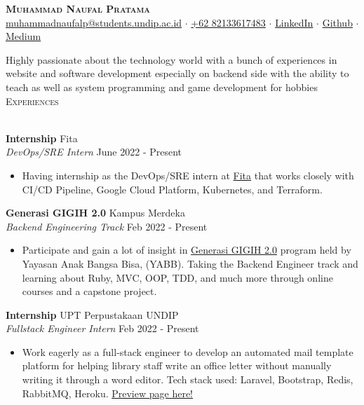 \documentclass[a4paper]{article}
\newcommand{\lineunder} {
    \vspace*{-8pt} \\
    \hspace*{-18pt} \hrulefill \\
}
\newcommand{\header} [1] {
    {\hspace*{-18pt}\vspace*{6pt} \textsc{#1}}
    \vspace*{-6pt} \lineunder
}
\begin{document}
\vspace*{-40pt}

\vspace*{-10pt}
\begin{center}
	{\Huge \scshape \textbf{Muhammad Naufal Pratama}}\\
	\href{mailto:muhammadnaufalp@students.undip.ac.id}{muhammadnaufalp@students.undip.ac.id} $\cdot$ \href{https://wa.me/6282133617483}{+62 82133617483} $\cdot$ \href{https://linkedin.com/in/mnpratamaa}{LinkedIn} $\cdot$ \href{https://github.com/mhnaufal}{Github} $\cdot$ \href{mprtmma.medium.com}{Medium}\\
\end{center}

Highly passionate about the technology world with a bunch of experiences in website and software development especially on backend side with the ability to teach as well as system programming and game development for hobbies\\

\header{Experiences}
\vspace{1mm}

\textbf{Internship} \hfill Fita\\
\textit{DevOps/SRE Intern} \hfill June 2022 - Present\\
\vspace{-1mm}
\begin{itemize} \itemsep 1pt
	\item Having internship as the DevOps/SRE intern at \href{https://fita.co.id/}{Fita} that works closely with CI/CD Pipeline, Google Cloud Platform, Kubernetes, and Terraform.
\end{itemize}

\textbf{Generasi GIGIH 2.0} \hfill Kampus Merdeka \\
\textit{Backend Engineering Track} \hfill Feb 2022 - Present\\
\vspace{-1mm}
\begin{itemize} \itemsep 1pt
	\item Participate and gain a lot of insight in \href{https://www.anakbangsabisa.org/generasi-gigih/}{Generasi GIGIH 2.0} program held by Yayasan Anak Bangsa Bisa, (YABB). Taking the Backend Engineer track and learning about Ruby, MVC, OOP, TDD, and much more through online courses and a capstone project.
\end{itemize}

\textbf{Internship} \hfill UPT Perpustakaan UNDIP \\
\textit{Fullstack Engineer Intern} \hfill Feb 2022 - Present\\
\vspace{-1mm}
\begin{itemize} \itemsep 1pt
	\item Work eagerly as a full-stack engineer to develop an automated mail template platform for helping library staff write an office letter without manually writing it through a word editor. Tech stack used: Laravel, Bootstrap, Redis, RabbitMQ, Heroku. \href{http://template-surat-testing.herokuapp.com/}{Preview page here!}
\end{itemize}
\end{document}

